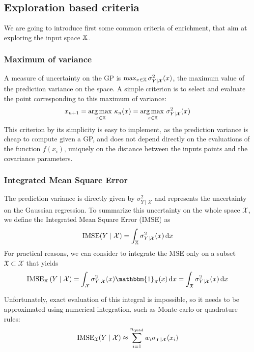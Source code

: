 \documentclass[../../Main_ManuscritThese.tex]{subfiles}
\begin{document}
\subsection{Exploration based criteria}
\label{sec:exploration_criteria}
We are going to introduce first some common criteria of enrichment, that aim at exploring the input space $\mathbb{X}$.

\subsubsection{Maximum of variance}
A measure of uncertainty on the GP is $\max_{x\in\mathbb{X}} \sigma_{Y \mid \mathcal{X}}^2(x)$, the maximum value of the prediction variance on the space.
A simple criterion is to select and evaluate the point corresponding to this maximum of variance:
\begin{equation}
  x_{n+1} = \operatorname*{arg\,max \,}_{x\in \mathbb{X}} \kappa_n(x) = \operatorname*{arg\,max \,}_{x \in \mathbb{X}} \sigma^2_{Y \mid \mathcal{X}}(x)
\end{equation}
This criterion by its simplicity is easy to implement, as the prediction variance is cheap to compute given a GP, and does not depend directly on the evaluations of the function $f(x_i)$, uniquely on the distance between the inputs points and the covariance parameters.

\subsubsection{Integrated Mean Square Error}
\cite{sacks_designs_1989}
The prediction variance is directly given by $\sigma^2_{Y\mid \mathcal{X}}$ and represents the uncertainty on the Gaussian regression. To summarize this uncertainty on the whole space $\mathcal{X}$, we define the Integrated Mean Square Error (IMSE) as
\begin{equation}
  \operatorname{\mathrm{IMSE}}(Y \mid \mathcal{X}) = \int_{\mathbb{X}} \sigma_{Y\mid\mathcal{X}}^2(x)\,\mathrm{d}x
\end{equation}
For practical reasons, we can consider to integrate the MSE only on a subset $\mathfrak{X}\subset \mathcal{X}$ that yields
\begin{equation}
  \IMSE_{\mathfrak{X}}\left(Y \mid \mathcal{X} \right) = \int_{\mathcal{X}} \sigma^2_{Y\mid \mathcal{X}}(x)  \mathbbm{1}_{\mathfrak{X}}(x)\,\mathrm{d}x = \int_{\mathfrak{X}} \sigma^2_{Y\mid \mathcal{X}}(x)\,\mathrm{d}x
\end{equation}

Unfortunately, exact evaluation of this integral is impossible, so it needs to be approximated using numerical integration, such as Monte-carlo or quadrature rules:
\begin{equation}
  \operatorname{\mathrm{IMSE}}_{\mathfrak{X}}(Y\mid \mathcal{X}) \approx \sum_{i=1}^{n_{\mathrm{quad}}} w_i \sigma_{Y\mid\mathcal{X}}(x_i)
\end{equation}
\end{document}
